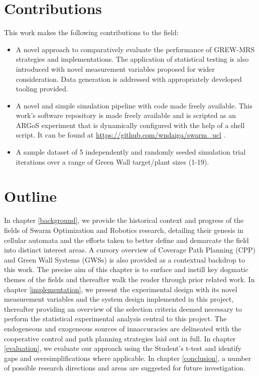 \documentclass{report}
\begin{document}
\section{Contributions}
This work makes the following contributions to the field:

\begin{itemize}
	\item A novel approach to comparatively evaluate the performance of GREW-MRS strategies and implementations. The application of statistical testing is also introduced with novel measurement variables proposed for wider consideration. Data generation is addressed with appropriately developed tooling provided.
	\item A novel and simple simulation pipeline with code made freely available. This work's software repository is made freely available and is scripted as an ARGoS experiment that is dynamically configured with the help of a shell script. It can be found at \url{https://github.com/wndaiga/swarm_ucl} \cite{SWARMCODE}.
	\item A sample dataset of 5 independently and randomly seeded simulation trial iterations over a range of Green Wall target/plant sizes (1-19).
\end{itemize}

\section{Outline}

In chapter \ref{background}, we provide the historical context and progress of the fields of Swarm Optimization and Robotics research, detailing their genesis in cellular automata and the efforts taken to better define and demarcate the field into distinct interest areas. A cursory overview of Coverage Path Planning (CPP) and Green Wall Systems (GWSs) is also provided as a contextual backdrop to this work. The precise aim of this chapter is to surface and instill key dogmatic themes of the fields and thereafter walk the reader through prior related work.  In chapter \ref{implementation}, we present the experimental design with its novel measurement variables and the system design implemented in this project, thereafter providing an overview of the selection criteria deemed necessary to perform the statistical experimental analysis central to this project. The endogeneous and exogeneous sources of innaccuracies are delineated with the cooperative control and path planning strategies laid out in full. In chapter \ref{evaluation}, we evaluate our approach using the Student's t-test \cite{Kennedy1995} and identify gaps and oversimplifications where applicable. In chapter \ref{conclusion}, a number of possible research directions and areas are suggested for future investigation.
\end{document}
